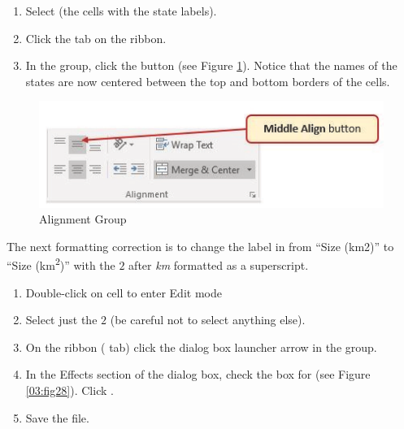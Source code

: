\begin{enumerate}
	\item Select  (the cells with the state labels).
	\item Click the  tab on the ribbon.
	\item In the  group, click the  button (see Figure \ref{03:fig27}). Notice that the names of the states are now centered between the top and bottom borders of the cells.
\end{enumerate}

\begin{figure}[H]
	\centering
	\includegraphics[width=\maxwidth{.95\linewidth}]{gfx/ch03_fig27}
	\caption{Alignment Group}
	\label{03:fig27}
\end{figure}

The next formatting correction is to change the label in  from ``Size (km2)'' to ``Size (km\textsuperscript{2})'' with the $ 2 $ after \textit{km} formatted as a superscript.

\begin{enumerate}
	\item Double-click on cell  to enter Edit mode
	\item Select just the $ 2 $ (be careful not to select anything else).
	\item On the ribbon ( tab) click the dialog box launcher arrow in the  group.
	\item In the Effects section of the  dialog box, check the box for  (see Figure \ref{03:fig28}). Click .
	\item Save the  file.
\end{enumerate}

